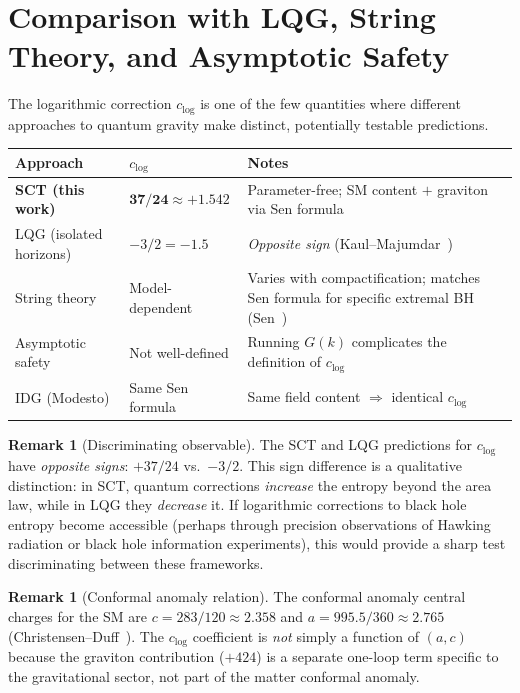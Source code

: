 \documentclass[11pt,a4paper]{article}
\theoremstyle{plain}
\theoremstyle{definition}
\newtheorem{remark}[theorem]{Remark}
\begin{document}
\section{Comparison with LQG, String Theory, and Asymptotic Safety}
\label{sec:comparison}

The logarithmic correction $c_{\log}$ is one of the few quantities
where different approaches to quantum gravity make distinct,
potentially testable predictions.

\begin{center}
\begin{tabular}{llp{7cm}}
\toprule
Approach & $c_{\log}$ & Notes \\
\midrule
\textbf{SCT (this work)} & $\mathbf{37/24 \approx +1.542}$ &
  Parameter-free; SM content $+$ graviton via Sen formula \\
LQG (isolated horizons) & $-3/2 = -1.5$ &
  \emph{Opposite sign} (Kaul--Majumdar~\cite{KM00}) \\
String theory & Model-dependent &
  Varies with compactification; matches Sen formula for
  specific extremal BH (Sen~\cite{Sen12}) \\
Asymptotic safety & Not well-defined &
  Running $G(k)$ complicates the definition of $c_{\log}$ \\
IDG (Modesto) & Same Sen formula &
  Same field content $\Rightarrow$ identical $c_{\log}$ \\
\bottomrule
\end{tabular}
\end{center}

\begin{remark}[Discriminating observable]
The SCT and LQG predictions for $c_{\log}$ have \emph{opposite
signs}: $+37/24$ vs.\ $-3/2$.  This sign difference is a
qualitative distinction: in SCT, quantum corrections
\emph{increase} the entropy beyond the area law, while in LQG
they \emph{decrease} it.  If logarithmic corrections to black
hole entropy become accessible (perhaps through precision
observations of Hawking radiation or black hole information
experiments), this would provide a sharp test discriminating
between these frameworks.
\end{remark}

\begin{remark}[Conformal anomaly relation]
The conformal anomaly central charges for the SM are
$c = 283/120 \approx 2.358$ and $a = 995.5/360 \approx 2.765$
(Christensen--Duff~\cite{CD78}).  The $c_{\log}$ coefficient
is \emph{not} simply a function of $(a, c)$ because the graviton
contribution ($+424$) is a separate one-loop term specific to
the gravitational sector, not part of the matter conformal anomaly.
\end{remark}
\end{document}
